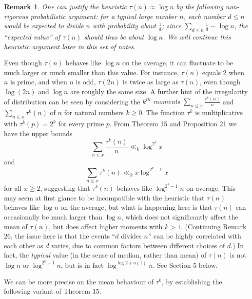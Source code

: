 \documentclass[10pt,reqno]{amsart}
\newtheorem{remark}[theorem]{Remark}
\begin{document}
\begin{remark}
    One can justify the heuristic $\tau(n) \approx \log n$ by the following non-rigorous probabilistic argument: for a typical large number $n$, each number $d \leq n$ would be expected to divide $n$ with probability about $\frac{1}{d}$; since $\sum_{d \leq n} \frac{1}{d} \sim \log n$, the “expected value” of $\tau(n)$ should thus be about $\log n$. We will continue this heuristic argument later in this set of notes.
\end{remark}

Even though $\tau(n)$ behaves like $\log n$ on the average, it can fluctuate to be much larger or much smaller than this value. For instance, $\tau(n)$ equals $2$ when $n$ is prime, and when $n$ is odd, $\tau(2n)$ is twice as large as $\tau(n)$, even though $\log(2n)$ and $\log n$ are roughly the same size. A further hint of the irregularity of distribution can be seen by considering the \emph{$k^{th}$ moments} $\sum_{n \leq x} \frac{\tau^k(n)}{n}$ and $\sum_{n \leq x} \tau^k(n)$ of $n$ for natural numbers $k \geq 0$. The function $\tau^k$ is multiplicative with $\tau^k(p) = 2^k$ for every prime $p$. From Theorem 15 and Proposition 21 we have the upper bounds
%
\[  \sum_{n \leq x} \frac{\tau^k(n)}{n} \ll_k \log^{2^k} x\]
%
and
%
\begin{equation}   \sum_{n \leq x} \tau^k(n) \ll_k x \log^{2^k-1} x \end{equation}
%
for all $x \geq 2$, suggesting that $\tau^k(n)$ behaves like $\log^{2^k-1} n$ on average. This may seem at first glance to be incompatible with the heuristic that $\tau(n)$ behaves like $\log n$ on the average, but what is happening here is that $\tau(n)$ can occasionally be much larger than $\log n$, which does not significantly affect the mean of $\tau(n)$, but does affect higher moments with $k > 1$. (Continuing Remark 26, the issue here is that the events “$d$ divides $n$” can be highly correlated with each other as $d$ varies, due to common factors between different choices of $d$.) In fact, the \emph{typical} value (in the sense of median, rather than mean) of $\tau(n)$ is not $\log n$ or $\log^{2^k-1} n$, but is in fact $\log^{\log 2+o(1)} n$. See Section 5 below.

We can be more precise on the mean behaviour of $\tau^k$, by establishing the following variant of Theorem 15.
\end{document}
